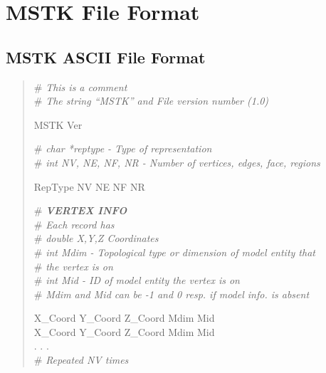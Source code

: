 \documentclass[12pt]{article}
\begin{document}
\newpage
\section{MSTK File Format}
\label{app:file_format}

\subsection{MSTK ASCII File Format}

\begin{verse}
\# {\em This is a comment} \\
\# {\em The string ``MSTK'' and File version number (1.0)} \\
\vspace{1ex}
 
MSTK Ver %
\vspace{1ex}

\# {\em char *reptype - Type of representation} \\  
\# {\em {\em int} NV, NE, NF, NR - Number of vertices, edges, face, regions} \\
\vspace{1ex}

RepType \hspace{0.5ex} NV \hspace{0.5ex} NE \hspace{0.5ex} NF \hspace{0.5ex} NR \\
\hspace{2ex}

\# {\em {\bf VERTEX INFO}} \\
\# {\em Each record has} \\
\# {\em double X,Y,Z Coordinates} \\
\# {\em {\em int} Mdim - Topological type or dimension of model entity that} \\
\# {\em \hspace{4.7em} the vertex is on} \\
\# {\em {\em int} Mid - ID of model entity the vertex is on} \\
\# {\em Mdim and Mid can be -1 and 0 resp. if model info. is absent} 
\vspace{1ex}

X\_Coord \hspace{0.5ex} Y\_Coord \hspace{0.5ex} Z\_Coord \hspace{0.5ex} Mdim \hspace{0.5ex} Mid \\
X\_Coord \hspace{0.5ex} Y\_Coord \hspace{0.5ex} Z\_Coord \hspace{0.5ex} Mdim \hspace{0.5ex} Mid \\
. . . \\
\# {\em Repeated NV times}
\vspace{2ex}


\end{verse}
\end{document}
